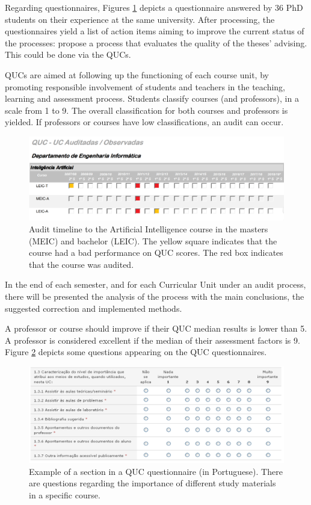 \documentclass[12pt,a4paper]{article}
\theoremstyle{definition}
\begin{document}
Regarding questionnaires, Figures \ref{fig:quc_3_1} depicts a questionnaire answered by 36 PhD students on their experience at the same university. After processing, the questionnaires yield a list of action items aiming to improve the current status of the processes: propose a process that evaluates the quality of the theses' advising. This could be done via the QUCs.

QUCs are aimed at following up the functioning of each course unit, by promoting responsible involvement of students and teachers in the teaching, learning and assessment process. Students classify courses (and professors), in a scale from 1 to 9. The overall classification for both courses and professors is yielded. If professors or courses have low classifications, an audit can occur.  


\begin{figure}
    \centering
    \includegraphics[scale=0.6]{figures/audits.PNG}
    \caption{Audit timeline to the Artificial Intelligence course in the masters (MEIC) and bachelor (LEIC). The yellow square indicates that the course had a bad performance on QUC scores. The red box indicates that the course was audited.}
    \label{fig:quc_3_1}
\end{figure}

In the end of each semester, and for each Curricular Unit under an audit process, there will be presented the analysis of the process with the main conclusions, the suggested correction and implemented methods.

A professor or course should improve if their QUC median results is lower than 5. A professor is considered excellent if the median of their assessment factors is 9. Figure \ref{fig:quc1} depicts some questions appearing on the QUC questionnaires.

\begin{figure}
    \centering
    \includegraphics[scale=0.6]{figures/quc_1.PNG}
    \caption{Example of a section in a QUC questionnaire (in Portuguese). There are questions regarding the importance of different study materials in a specific course.}
    \label{fig:quc1}
\end{figure}
\end{document}
